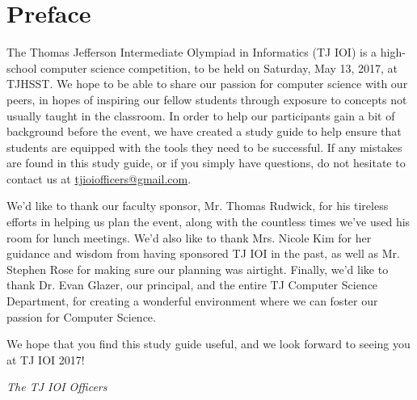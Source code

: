 \chapter{Preface}

The Thomas Jefferson Intermediate Olympiad in Informatics (TJ IOI) is a high-school computer science competition, to be held on Saturday, May 13, 2017, at TJHSST.  We hope to be able to share our passion for computer science with our peers, in hopes of inspiring our fellow students through exposure to concepts not usually taught in the classroom.  In order to help our participants gain a bit of background before the event, we have created a study guide to help ensure that students are equipped with the tools they need to be successful.  If any mistakes are found in this study guide, or if you simply have questions, do not hesitate to contact us at \href{mailto:tjioiofficers@gmail.com}{tjioiofficers@gmail.com}.

We'd like to thank our faculty sponsor, Mr. Thomas Rudwick, for his tireless efforts in helping us plan the event, along with the countless times we've used his room for lunch meetings. We'd also like to thank Mrs. Nicole Kim for her guidance and wisdom from having sponsored TJ IOI in the past, as well as Mr. Stephen Rose for making sure our planning was airtight. Finally, we'd like to thank Dr. Evan Glazer, our principal, and the entire TJ Computer Science Department, for creating a wonderful environment where we can foster our passion for Computer Science.

We hope that you find this study guide useful, and we look forward to seeing you at TJ IOI 2017!

\noindent\textit{The TJ IOI Officers} \\